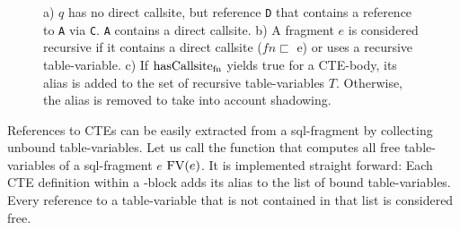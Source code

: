 \begin{figure}[h]
    \small
    \centering
    \caption{a) $q$ has no direct callsite, but reference \texttt{D} that contains a reference to \texttt{A} via \texttt{C}. \texttt{A} contains a direct callsite. b) A fragment $e$ is considered recursive if it contains a direct callsite ($fn \sqsubset$ e) or uses a recursive table-variable. c) If $\operatorname{\text{hasCallsite}_{fn}}$ yields true for a CTE-body, its alias is added to the set of recursive table-variables $T$. Otherwise, the alias is removed to take into account shadowing.}
    \label{fig:tracking_recursive_ctes}
\end{figure}

References to CTEs can be easily extracted from a sql-fragment by collecting unbound table-variables. Let us call the function that computes all free table-variables of a sql-fragment $e$ $\operatorname{\text{\rm FV}}(e)$. It is implemented straight forward: Each CTE definition within a \WITH-block adds its alias to the list of bound table-variables. Every reference to a table-variable that is not contained in that list is considered free.


